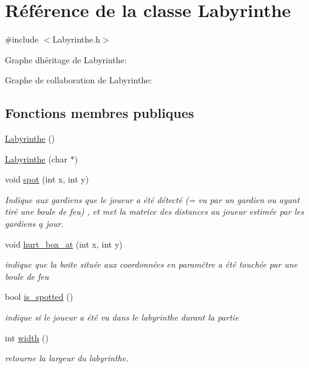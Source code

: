 \hypertarget{classLabyrinthe}{}\section{Référence de la classe Labyrinthe}
\label{classLabyrinthe}


{\ttfamily \#include $<$Labyrinthe.\+h$>$}



Graphe d\textquotesingle{}héritage de Labyrinthe\+:


Graphe de collaboration de Labyrinthe\+:
\subsection*{Fonctions membres publiques}
\begin{DoxyCompactItemize}
\item 
\hyperlink{classLabyrinthe_a46d8e42b8f59bf7e24ac7a967ac30e6e}{Labyrinthe} ()
\item 
\hyperlink{classLabyrinthe_a16aa4865644d59a8ed9fde15cd5e7275}{Labyrinthe} (char $\ast$)
\item 
void \hyperlink{classLabyrinthe_aced71da0513e259c3f6ac9eead7a24b3}{spot} (int x, int y)
\begin{DoxyCompactList}\small\item\em Indique aux gardiens que le joueur a été détecté (= vu par un gardien ou ayant tiré une boule de feu) , et met la matrice des distances au joueur estimée par les gardiens ą jour. \end{DoxyCompactList}\item 
void \hyperlink{classLabyrinthe_a9e1bf06193f8e7763ebf733a9eaf4a17}{hurt\+\_\+box\+\_\+at} (int x, int y)
\begin{DoxyCompactList}\small\item\em indique que la boite située aux coordonnées en paramčtre a été touchée par une boule de feu \end{DoxyCompactList}\item 
bool \hyperlink{classLabyrinthe_abee287932a7d9e1088224d0564d39d46}{is\+\_\+spotted} ()
\begin{DoxyCompactList}\small\item\em indique si le joueur a été vu dans le labyrinthe durant la partie \end{DoxyCompactList}\item 
int \hyperlink{classLabyrinthe_a55373ffb068b7f84c24108ce0f7d111c}{width} ()
\begin{DoxyCompactList}\small\item\em retourne la largeur du labyrinthe. \end{DoxyCompactList}\item 

\end{DoxyCompactItemize}
